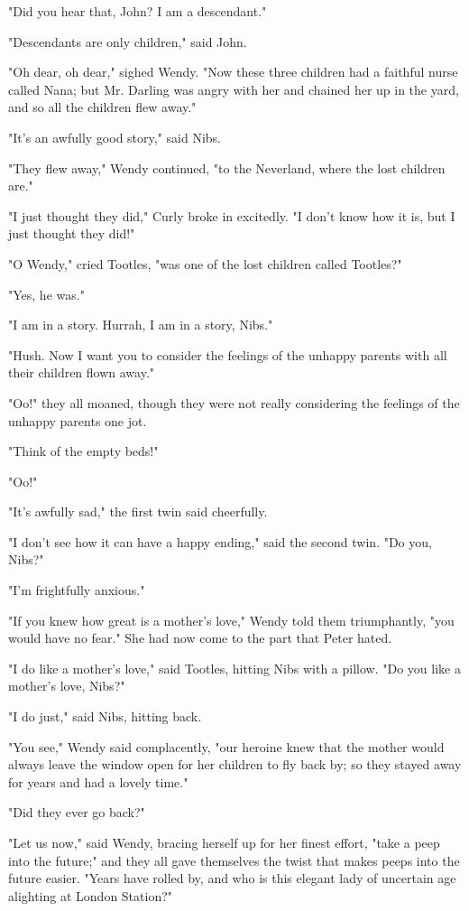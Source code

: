"Did you hear that, John? I am a descendant."


"Descendants are only children," said John.


"Oh dear, oh dear," sighed Wendy. "Now these three children had a faithful
nurse called Nana; but Mr. Darling was angry with her and chained her up
in the yard, and so all the children flew away."


"It's an awfully good story," said Nibs.


"They flew away," Wendy continued, "to the Neverland, where the lost
children are."


"I just thought they did," Curly broke in excitedly. "I don't know how it
is, but I just thought they did!"


"O Wendy," cried Tootles, "was one of the lost children called Tootles?"


"Yes, he was."


"I am in a story. Hurrah, I am in a story, Nibs."


"Hush. Now I want you to consider the feelings of the unhappy parents with
all their children flown away."


"Oo!" they all moaned, though they were not really considering the
feelings of the unhappy parents one jot.


"Think of the empty beds!"


"Oo!"


"It's awfully sad," the first twin said cheerfully.


"I don't see how it can have a happy ending," said the second twin. "Do
you, Nibs?"


"I'm frightfully anxious."


"If you knew how great is a mother's love," Wendy told them triumphantly,
"you would have no fear." She had now come to the part that Peter hated.


"I do like a mother's love," said Tootles, hitting Nibs with a pillow. "Do
you like a mother's love, Nibs?"


"I do just," said Nibs, hitting back.


"You see," Wendy said complacently, "our heroine knew that the mother
would always leave the window open for her children to fly back by; so
they stayed away for years and had a lovely time."


"Did they ever go back?"


"Let us now," said Wendy, bracing herself up for her finest effort, "take
a peep into the future;" and they all gave themselves the twist that makes
peeps into the future easier. "Years have rolled by, and who is this
elegant lady of uncertain age alighting at London Station?"


